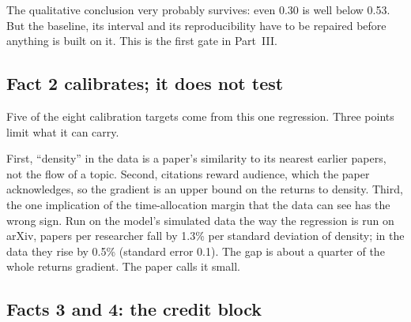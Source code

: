 The qualitative conclusion very probably survives: even 0.30 is well below 0.53. But the baseline, its interval and its reproducibility have to be repaired before anything is built on it. This is the first gate in Part~III.

\subsection{Fact 2 calibrates; it does not test}

Five of the eight calibration targets come from this one regression. Three points limit what it can carry.

First, ``density'' in the data is a paper's similarity to its nearest earlier papers, not the flow of a topic. Second, citations reward audience, which the paper acknowledges, so the gradient is an upper bound on the returns to density. Third, the one implication of the time-allocation margin that the data can see has the wrong sign. Run on the model's simulated data the way the regression is run on arXiv, papers per researcher fall by 1.3\% per standard deviation of density; in the data they rise by 0.5\% (standard error 0.1). The gap is about a quarter of the whole returns gradient. The paper calls it small.

\subsection{Facts 3 and 4: the credit block}

